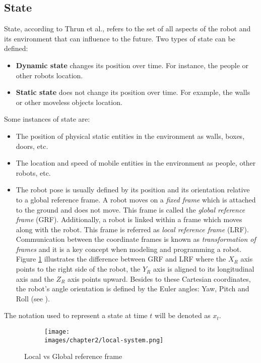 \subsection{State}

State, according to Thrun et al.\cite{Thrun:2005:PR:1121596}, refers to the set of all aspects of the robot and its environment that can influence to the future. Two types of state can be defined:

\begin{itemize}
\item \textbf{Dynamic state} changes its position over time. For instance, the people or other robots location.
\item \textbf{Static state} does not change its position over time. For example, the walls or other moveless objects location.
\end{itemize}

Some instances of state are: 

\begin{itemize}
\item The position of physical static entities in the environment as walls, boxes, doors, etc.
\item The location and speed of mobile entities in the environment as people, other robots, etc.
\item The robot pose is usually defined by its position and its orientation relative to a global reference frame. A robot moves on a \textit{fixed frame} which is attached to the ground and does not move. This frame is called the \textit{global reference frame} (GRF). Additionally, a robot is linked within a frame which moves along with the robot. This frame is referred as \textit{local reference frame} (LRF). Communication between the coordinate frames is known as \textit{transformation of frames} and it is a key concept when modeling and programming a robot\cite{Reza:Theory-of-applied-robotics}. Figure \ref{fig:ch-2-global-local} illustrates the difference between GRF and LRF where the $X_R$ axis points to the right side of the robot, the $Y_R$ axis is aligned to its longitudinal axis and the $Z_R$ axis points upward. Besides to these Cartesian coordinates, the robot's angle orientation is defined by the Euler angles: Yaw, Pitch and Roll (see \cite{Cook:mobile-robots}). 
\end{itemize}

The notation used to represent a state at time $t$ will be denoted as $x_t$.

\begin{figure}[h!]
  \centering
  \begin{subfigure}[b]{0.5\linewidth}
  	\texttt{[image: \\images/chapter2/local-system.png]}
  \end{subfigure}
  \caption{Local vs Global reference frame}
  \label{fig:ch-2-global-local}
\end{figure}

